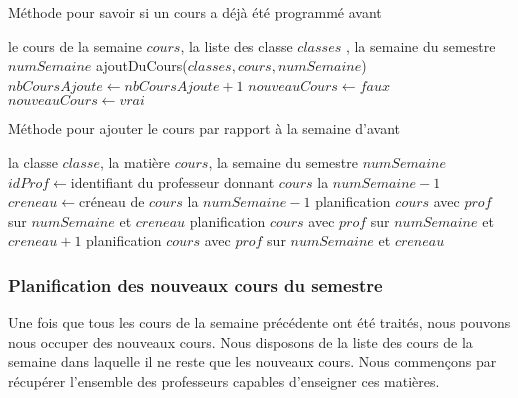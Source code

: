 \begin{algorithm}
\caption{Méthode pour savoir si un cours a déjà été programmé avant}
\begin{algorithmic}
\REQUIRE le cours de la semaine $cours$, la liste des classe $classes$ , la semaine du semestre $numSemaine$
\STATE ajoutDuCours($classes, cours, numSemaine$)
\STATE $nbCoursAjoute \leftarrow nbCoursAjoute + 1$
\ENDIF
\ENDFOR
{}
\STATE $nouveauCours \leftarrow faux$
\ELSE
\STATE $nouveauCours \leftarrow vrai$ 
\ENDIF
\end{algorithmic}
\end{algorithm}


\begin{algorithm}
\caption{Méthode pour ajouter le cours par rapport à la semaine d'avant}
\begin{algorithmic}
\REQUIRE la classe $classe$, la matière $cours$, la semaine du semestre $numSemaine$
\STATE $idProf \leftarrow $identifiant du professeur donnant $cours$ la $numSemaine - 1$
\STATE $creneau \leftarrow $créneau de $cours$ la $numSemaine - 1$
\STATE planification $cours$ avec $prof$ sur $numSemaine$ et $creneau$
\STATE planification $cours$ avec $prof$ sur $numSemaine$ et $creneau +1$
\ENDIF
\ELSE
{}
\STATE planification $cours$ avec $prof$ sur $numSemaine$ et $creneau$
\ENDIF
\ENDIF
\end{algorithmic}
\end{algorithm}

\newpage

\subsubsection{Planification des nouveaux cours du semestre}

Une fois que tous les cours de la semaine précédente ont été traités, nous pouvons nous occuper des nouveaux cours. Nous disposons de la liste des cours de la semaine dans laquelle il ne reste que les nouveaux cours. Nous commençons par récupérer l'ensemble des professeurs capables d'enseigner ces matières.\\

